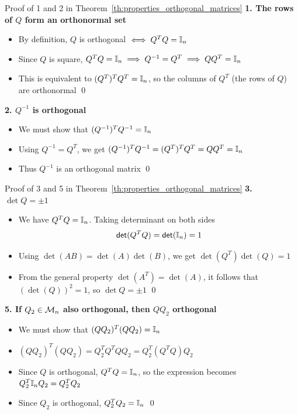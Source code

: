 \documentclass[aspectratio=169]{beamer}\usepackage[]{graphicx}\usepackage[]{xcolor}
\begin{document}
\begin{frame}{Proof of 1 and 2 in Theorem~\ref{th:properties_orthogonal_matrices}}
\textbf{1. The rows of $Q$ form an orthonormal set}
\begin{itemize}
\item By definition, $Q$ is orthogonal $\iff Q^TQ = \mathbb{I}_n$
\item Since $Q$ is square, $Q^TQ = \mathbb{I}_n \implies Q^{-1} = Q^T \implies QQ^T = \mathbb{I}_n$
\item This is equivalent to $(Q^T)^T Q^T = \mathbb{I}_n$, so the columns of $Q^T$ (the rows of $Q$) are orthonormal \hfill\qed
\end{itemize}
\vfill
\textbf{2. $Q^{-1}$ is orthogonal}
\begin{itemize}
\item We must show that $(Q^{-1})^T Q^{-1} = \mathbb{I}_n$
\item Using $Q^{-1} = Q^T$, we get $(Q^{-1})^T Q^{-1} = (Q^T)^T Q^T = Q Q^T = \mathbb{I}_n$
\item Thus $Q^{-1}$ is an orthogonal matrix \hfill\qed
\end{itemize}
\end{frame}



\begin{frame}{Proof of 3 and 5 in Theorem~\ref{th:properties_orthogonal_matrices}}
\textbf{3. $\det Q = \pm 1$}
\begin{itemize}
\item We have $Q^T Q = \mathbb{I}_n$. Taking determinant on both sides 
\[
\mathsf{det}(Q^T Q) = \mathsf{det}(\mathbb{I}_n) = 1
\]
\item Using $\det(AB)=\det(A)\det(B)$, we get $\det(Q^T) \det(Q) = 1$
\item From the general property $\det(A^T) = \det(A)$, it follows that $(\det(Q))^2 = 1$, so $\det Q = \pm 1$ \hfill\qed
\end{itemize}
\vfill
\textbf{5. If $Q_2\in\mathcal{M}_n$ also orthogonal, then $QQ_2$ orthogonal}
\begin{itemize}
\item We must show that $(QQ_2)^T (QQ_2) = \mathbb{I}_n$
\item $(QQ_2)^T (QQ_2) = Q_2^T Q^T Q Q_2 = Q_2^T (Q^T Q) Q_2$
\item Since $Q$ is orthogonal, $Q^TQ = \mathbb{I}_n$, so the expression becomes $Q_2^T \mathbb{I}_n Q_2 = Q_2^T Q_2$
\item Since $Q_2$ is orthogonal, $Q_2^T Q_2 = \mathbb{I}_n$ \hfill\qed
\end{itemize}
\end{frame}
\end{document}
